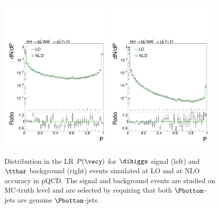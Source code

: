 \begin{figure}
\begin{center}
\begin{picture}
\end{picture}
\end{center}
\fi
\ifx\ver\verPAPER
\centering
\includegraphics[width=0.48\textwidth]{plots/hh_bbwwMEM_dilepton_lo_vs_nlo_memLR_signal.pdf}
\includegraphics[width=0.48\textwidth]{plots/hh_bbwwMEM_dilepton_lo_vs_nlo_memLR_background.pdf}
\fi
\caption{
  Distribution in the LR $P(\vecy)$ 
  for $\dihiggs$ signal (left) and $\ttbar$ background (right) events
  simulated at LO and at NLO accuracy in pQCD.
  The signal and background events are studied on MC-truth level
  and are selected by requiring that both $\Pbottom$-jets are genuine $\Pbottom$-jets.
}
\label{fig:memLR_LO_vs_NLO}
\end{figure}


